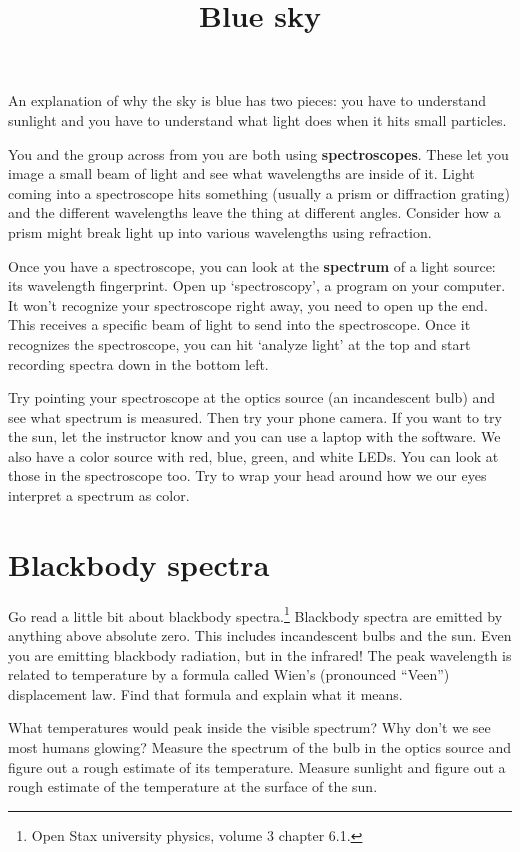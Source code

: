 \documentclass[phy1200]{handout}
\title{Blue sky}
\begin{document}
\maketitle

An explanation of why the sky is blue has two pieces: you have to understand sunlight and you have to understand what light does when it hits small particles.

You and the group across from you are both using \textbf{spectroscopes}. These let you image a small beam of light and see what wavelengths are inside of it. Light coming into a spectroscope hits something (usually a prism or diffraction grating) and the different wavelengths leave the thing at different angles. Consider how a prism might break light up into various wavelengths using refraction.

Once you have a spectroscope, you can look at the \textbf{spectrum} of a light source: its wavelength fingerprint. Open up `spectroscopy', a program on your computer. It won't recognize your spectroscope right away, you need to open up the end. This receives a specific beam of light to send into the spectroscope. Once it recognizes the spectroscope, you can hit `analyze light' at the top and start recording spectra down in the bottom left.

Try pointing your spectroscope at the optics source (an incandescent bulb) and see what spectrum is measured. Then try your phone camera. If you want to try the sun, let the instructor know and you can use a laptop with the software. We also have a color source with red, blue, green, and white LEDs. You can look at those in the spectroscope too. Try to wrap your head around how we our eyes interpret a spectrum as color.

\section{Blackbody spectra}

Go read a little bit about blackbody spectra.\footnote{Open Stax university physics, volume 3 chapter 6.1.} Blackbody spectra are emitted by anything above absolute zero. This includes incandescent bulbs and the sun. Even you are emitting blackbody radiation, but in the infrared! The peak wavelength is related to temperature by a formula called Wien's (pronounced ``Veen'') displacement law. Find that formula and explain what it means. 

What temperatures would peak inside the visible spectrum? Why don't we see most humans glowing? Measure the spectrum of the bulb in the optics source and figure out a rough estimate of its temperature. Measure sunlight and figure out a rough estimate of the temperature at the surface of the sun.
\end{document}
